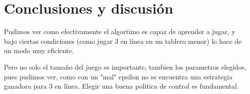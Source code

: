 \newpage
\section{Conclusiones y discusión}

Pudimos ver como efectivamente el algortimo es capaz de aprender a jugar, y bajo ciertas condiciones (como jugar 3 en línea en un tablero menor) lo hace de un modo muy eficiente.

Pero no solo el tamaño del juego es importante, tambien los parametros elegidos, pues pudimos ver, como con un "mal" epsilon no se encuentra una estrategia ganadora para 3 en línea. Elegir una buena politica de control es fundamental. 
